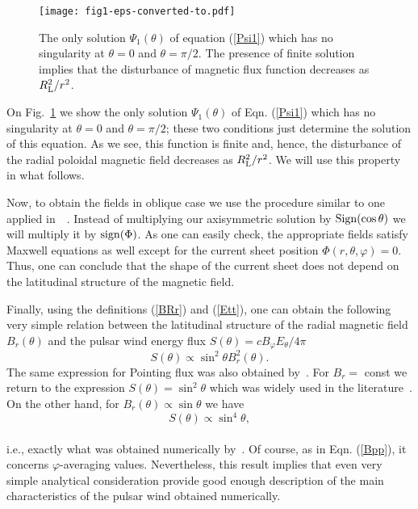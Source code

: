 \documentclass[useAMS,usenatbib]{mn2e}
\begin{document}

\begin{figure}
\centering
\texttt{[image: fig1-eps-converted-to.pdf]}
\caption{The only solution  $\Psi_{1}(\theta)$ of equation (\ref{Psi1}) which has no singularity at $\theta = 0$ and \mbox{$\theta = \pi/2$}. The presence of finite solution implies that the disturbance of magnetic flux function decreases as $R^2_{\rm L}/r^2$.}
\label{fig:Ing}
\end{figure}

On Fig.~\ref{fig:Ing} we show the only solution $\Psi_{1}(\theta)$ of Eqn. (\ref{Psi1}) which 
has no singularity at $\theta = 0$ and $\theta = \pi/2$; these two conditions just determine 
the solution of this equation. As we see, this function is finite and, hence, the disturbance of the
radial poloidal magnetic field decreases as $R_{\rm L}^2/r^2$. We will use this property in what follows.

Now, to obtain the fields in oblique case we use the procedure similar to one
applied in~~\citet{1999A&A...349.1017B}. Instead of multiplying our axisymmetric solution by
${\rm Sign}(\cos\theta)$ we will multiply it by ${\rm sign}(\Phi)$. As one can easily check,
the appropriate fields satisfy Maxwell equations as well except for the current
sheet position $\Phi(r, \theta, \varphi) = 0$. Thus, one can conclude that the shape
of the current sheet does not depend on the latitudinal structure of the magnetic field.

Finally, using the definitions (\ref{BRr}) and (\ref{Ett}), one can obtain the
following very simple relation between the latitudinal structure of the radial
magnetic field $B_{r}(\theta)$ and the pulsar wind energy flux
$S(\theta)=cB_{\varphi}E_{\theta}/4\pi$ 
\begin{equation}
S(\theta) \propto \sin^2\theta B_{r}^2(\theta).
\end{equation}
The same expression for Pointing flux was also obtained by~\citet{2016MNRAS.457.3384T}. For $B_{r} =$ const we return to the expression $S(\theta) = \sin^2\theta$
which was widely used in the literature~\citep{2002AstL...28..373B, 2003MNRAS.344L..93K}.
On the other hand, for
$B_{r}(\theta)  \propto  \sin\theta$ we have
\begin{equation}
S(\theta) \propto \sin^4\theta,
\end{equation}
\\
i.e., exactly what was obtained numerically by~\citet{SashaMHD}. Of course, as in Eqn.
(\ref{Bpp}), it concerns $\varphi$-averaging values. Nevertheless, this result
implies that even very simple analytical consideration provide good enough description of
the main characteristics of the pulsar wind obtained numerically.
\end{document}
